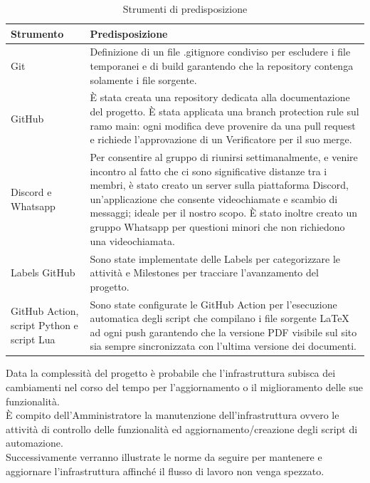 \begin{table}[!h]
\centering
\renewcommand{\arraystretch}{1.15}
\begin{tabular}{|p{}|p{}|}
    \hline
    \textbf{Strumento} & \textbf{Predisposizione} \\
    \hline
    Git & Definizione di un file .gitignore condiviso per escludere i file temporanei e di build garantendo che la repository contenga solamente i file sorgente. \\
    \hline
    GitHub & È stata creata una repository dedicata alla documentazione del progetto. È stata applicata una  branch protection rule sul ramo main: ogni modifica deve provenire da una pull request e richiede l’approvazione di un Verificatore per il suo merge.\\
    \hline
    Discord e \newline Whatsapp & Per consentire al gruppo di riunirsi settimanalmente, e venire incontro al fatto che ci sono significative distanze tra i membri, è stato creato un server sulla piattaforma Discord, un’applicazione che consente videochiamate e scambio di messaggi; ideale per il nostro scopo. È stato inoltre creato un gruppo Whatsapp per questioni minori che non richiedono una videochiamata. \\
    \hline
    Labels GitHub & Sono state implementate delle Labels per categorizzare le attività e Milestones per tracciare l’avanzamento del progetto.\\
    \hline
    GitHub Action, script Python e script Lua & Sono state configurate le GitHub Action per l’esecuzione automatica degli script che compilano i file sorgente LaTeX ad ogni push garantendo che la versione PDF visibile sul sito sia sempre sincronizzata con l’ultima versione dei documenti. \\
    \hline
\end{tabular}
\caption{Strumenti di predisposizione}
\end{table}

\newpage
{}
Data la complessità del progetto è probabile che l’infrastruttura subisca dei cambiamenti nel corso del tempo per l’aggiornamento o il miglioramento delle sue funzionalità.\\
È compito dell’Amministratore la manutenzione dell’infrastruttura ovvero le attività di controllo delle funzionalità ed aggiornamento/creazione degli script di automazione.\\
Successivamente verranno illustrate le norme da seguire per mantenere e aggiornare l’infrastruttura affinché il flusso di lavoro non venga spezzato.

